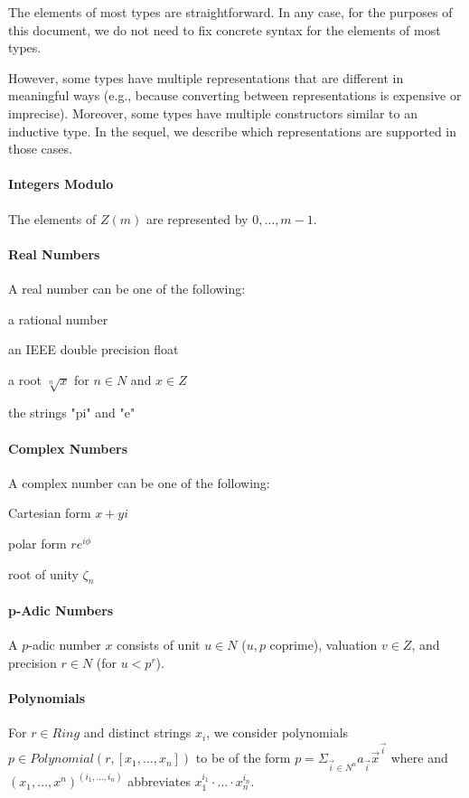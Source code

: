 The elements of most types are straightforward.
In any case, for the purposes of this document, we do not need to fix concrete syntax for the elements of most types.

However, some types have multiple representations that are different in meaningful ways (e.g., because converting between representations is expensive or imprecise).
Moreover, some types have multiple constructors similar to an inductive type.
In the sequel, we describe which representations are supported in those cases.

\paragraph{Integers Modulo}
The elements of $Z(m)$ are represented by $0,\ldots,m-1$.

\paragraph{Real Numbers}
A real number can be one of the following:
\begin{compactitem}
 \item a rational number
 \item an IEEE double precision float
 \item a root $\sqrt[n]{x}$ for $n\in N$ and $x\in Z$
 \item the strings "pi" and "e"
\end{compactitem}

\paragraph{Complex Numbers}
A complex number can be one of the following:
\begin{compactitem}
 \item Cartesian form $x+yi$
 \item polar form $r e^{i\phi}$
 \item root of unity $\zeta_n$
\end{compactitem}

\paragraph{p-Adic Numbers}
A $p$-adic number $x$ consists of unit $u\in N$ ($u,p$ coprime), valuation $v\in Z$, and precision $r\in N$ (for $u<p^r$).

\paragraph{Polynomials}
For $r\in Ring$ and distinct strings $x_i$, we consider polynomials $p\in Polynomial(r,[x_1,\ldots,x_n])$ to be of the form $p=\Sigma_{\vec{i}\in N^n} a_{\vec{i}} \vec{x}^{\vec{i}}$ where and $(x_1,\ldots,x^n)^{(i_1,\ldots,i_n)}$ abbreviates $x_1^{i_1}\cdot \ldots\cdot x_n^{i_n}$.

